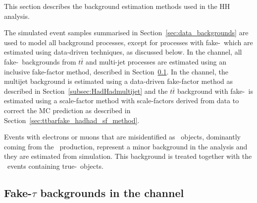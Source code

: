 This section describes the background estimation methods used in the HH analysis. 

The simulated event samples summarised in Section~\ref{sec:data_backgrounds} are used to model all background processes, except for processes with fake-\tauhad\ which are estimated using data-driven techniques, as discussed below. In the \lephad channel, all fake-\tauhad\ backgrounds from $t\bar{t}$ and multi-jet processes are estimated using an inclusive fake-factor method, described in Section~\ref{subsec:LepHadfake}. In the \hadhad channel, the multijet background is estimated using a data-driven fake-factor method as described in Section~\ref{subsec:HadHadmultijet} and the $t\bar{t}$ background with fake-\tauhad\ is estimated using a scale-factor method with scale-factors derived from data to correct the MC prediction as described in Section~\ref{sec:ttbarfake_hadhad_sf_method}.



Events with electrons or muons that are misidentified as \tauhad\ objects, 
dominantly coming from the \ttbar\ production, 
represent a minor background in the analysis and they are estimated from simulation. 
This background is treated together with the 
\ttbar\ events containing true-\tauhad\ objects. 


\subsection{Fake-$\tau$ backgrounds in the \lephad channel}
\label{subsec:LepHadfake}

